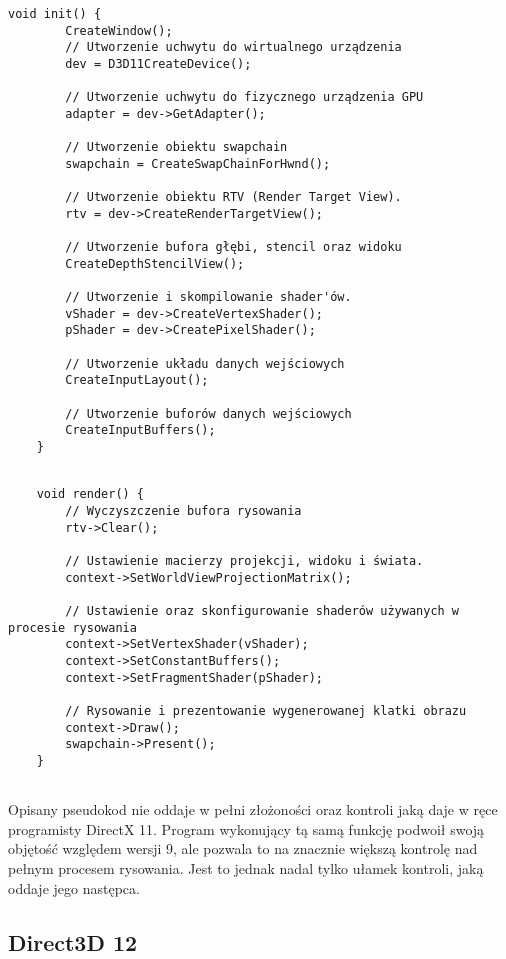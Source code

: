 \begin{lstlisting}[caption={Pseudokod inicjalizacji Direct3D 11 (oryginalna treść)}, label={lst:d3d11:init}]
	void init() {
		CreateWindow();	
		// Utworzenie uchwytu do wirtualnego urządzenia
		dev = D3D11CreateDevice();		
		
		// Utworzenie uchwytu do fizycznego urządzenia GPU
		adapter = dev->GetAdapter();	
		
		// Utworzenie obiektu swapchain
		swapchain = CreateSwapChainForHwnd();	
		
		// Utworzenie obiektu RTV (Render Target View).
		rtv = dev->CreateRenderTargetView();	
		
		// Utworzenie bufora głębi, stencil oraz widoku
		CreateDepthStencilView();	
		
		// Utworzenie i skompilowanie shader'ów.
		vShader = dev->CreateVertexShader();
		pShader = dev->CreatePixelShader();	
		
		// Utworzenie układu danych wejściowych
		CreateInputLayout();	
		
		// Utworzenie buforów danych wejściowych
		CreateInputBuffers();
	}	
\end{lstlisting}

\vfill

\begin{lstlisting}[caption={Pseudokod rysowania Direct3D 11 (oryginalna treść)}, label={lst:d3d11:render}]
	
	void render() {
		// Wyczyszczenie bufora rysowania
		rtv->Clear();
		
		// Ustawienie macierzy projekcji, widoku i świata.
		context->SetWorldViewProjectionMatrix();
		
		// Ustawienie oraz skonfigurowanie shaderów używanych w procesie rysowania
		context->SetVertexShader(vShader);	
		context->SetConstantBuffers();
		context->SetFragmentShader(pShader);
		
		// Rysowanie i prezentowanie wygenerowanej klatki obrazu
		context->Draw();
		swapchain->Present();
	}
	
\end{lstlisting}

Opisany pseudokod nie oddaje w pełni złożoności oraz kontroli jaką
daje w ręce programisty DirectX 11. Program wykonujący tą samą funkcję
podwoił swoją objętość względem wersji 9, ale pozwala to na znacznie
większą kontrolę nad pełnym procesem rysowania. Jest to jednak nadal tylko
ułamek kontroli, jaką oddaje jego następca.

\subsection{Direct3D 12}

